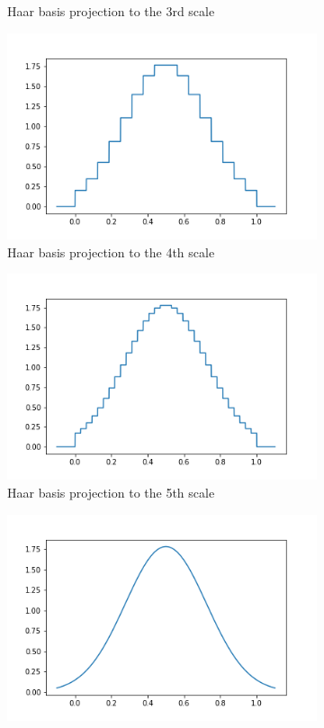 \documentclass[../master_thesis.tex]{subfiles}
\begin{document}
\begin{figure}[h!]
\begin{subfigure}[b]{0.49\linewidth}
    \caption{Haar basis projection to the 3rd scale}
  \end{subfigure}
  \begin{subfigure}[b]{0.49\linewidth}
    \includegraphics[width=\linewidth]{img/scale4.png}
    \caption{Haar basis projection to the 4th scale}
  \end{subfigure}
  \begin{subfigure}[b]{0.49\linewidth}
    \includegraphics[width=\linewidth]{img/scale5.png}
    \caption{Haar basis projection to the 5th scale}
  \end{subfigure}
  \begin{subfigure}[b]{0.49\linewidth}
    \includegraphics[width=\linewidth]{img/gaussian.png}

\end{subfigure}
\end{figure}
\end{document}
